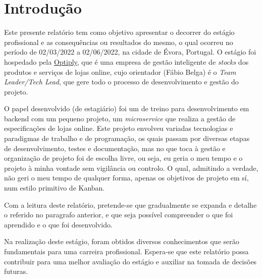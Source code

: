 \chapter{Introdução}\label{intro}

Este presente relatório tem como objetivo apresentar o decorrer do estágio profissional e as consequências ou resultados do mesmo, o qual ocorreu no período de 02/03/2022 a 02/06/2022, na cidade de Évora, Portugal. O estágio foi hospedado pela \href{https://optiply.nl/}{Optiply}, que é uma empresa de gestão inteligente de \textit{stocks} dos produtos e serviços de lojas online, cujo orientador (Fábio Belga) é o \textit{Team Leader/Tech Lead}, que gere todo o processo de desenvolvimento e gestão do projeto.

O papel desenvolvido (de estagiário) foi um de treino para desenvolvimento em backend com um pequeno projeto, um \textit{microservice} que realiza a gestão de especificações de lojas online. Este projeto envolveu variadas tecnologias e paradigmas de trabalho e de programação, os quais passam por diversas etapas de desenvolvimento, testes e documentação, mas no que toca à gestão e organização de projeto foi de escolha livre, ou seja, eu geria o meu tempo e o projeto à minha vontade sem vigilância ou controlo. O qual, admitindo a verdade, não geri o meu tempo de qualquer forma, apenas os objetivos de projeto em sí, num estilo primitivo de Kanban.

Com a leitura deste relatório, pretende-se que gradualmente se expanda e detalhe o referido no paragrafo anterior, e que seja possível compreender o que foi aprendido e o que foi desenvolvido.

Na realização deste estágio, foram obtidos diversos conhecimentos que serão fundamentais para uma carreira profissional. Espera-se que este relatório possa contribuir para uma melhor avaliação do estágio e auxiliar na tomada de decisões futuras.
